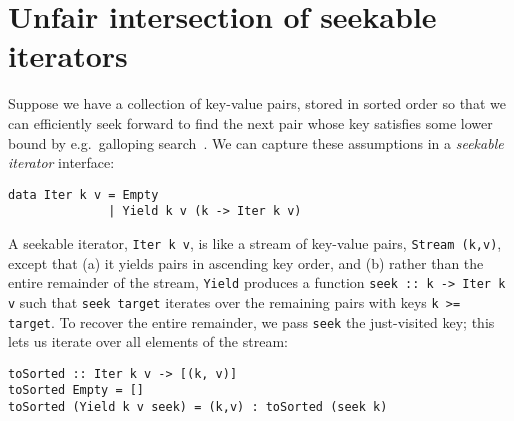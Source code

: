 \documentclass[acmsmall,screen,dvipsnames,svgnames]{acmart}
\newcommand\hask[1]{\texttt{#1}}
\newcommand\ttt\texttt
\newcommand\todo[1]{{\color{Orange}#1}}
\renewcommand\todo[1]{{\color{IndianRed}#1}}
\begin{document}




\section{Unfair intersection of seekable iterators}
\label{sec:unfair-intersection}

Suppose we have a collection of key-value pairs, stored in sorted order so that we can efficiently seek forward to find the next pair whose key satisfies some lower bound by e.g.\ galloping search~\citep{DBLP:journals/ipl/BentleyY76}.
We can capture these assumptions in a \emph{seekable iterator} interface:

\begin{verbatim}
data Iter k v = Empty
              | Yield k v (k -> Iter k v)
\end{verbatim}

\noindent
A seekable iterator, \hask{Iter k v}, is like a stream of key-value pairs, \hask{Stream (k,v)}, except that (a) it yields pairs in ascending key order, and (b) rather than the entire remainder of the stream, \hask{Yield} produces a function \hask{seek :: k -> Iter k v}
such that
\ttt{seek target} iterates over the remaining pairs with keys \ttt{k >= target}.
%
To recover the entire remainder, we pass \ttt{seek} the just-visited key; this lets us iterate over all elements of the stream:

\begin{verbatim}
toSorted :: Iter k v -> [(k, v)]
toSorted Empty = []
toSorted (Yield k v seek) = (k,v) : toSorted (seek k)
\end{verbatim}
\end{document}
